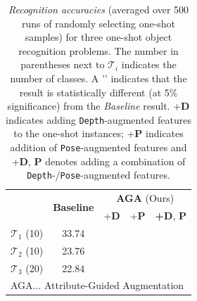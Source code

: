 \documentclass[10pt,twocolumn,letterpaper]{article}
\begin{document}
\begin{table}[t!]
\begin{tabular}{rcccc}
\hline
& \multirow{2}{*}{\textbf{Baseline}} & \multicolumn{3}{c}{\textbf{AGA} (Ours)}\\
& 						     &  +\textbf{D} & +\textbf{P} &  \textbf{+D}, \textbf{P} \\
\hline
$\mathcal{T}_1$ (10)  	& 33.74	
					&  \cellcolor{green!30}{38.84~\checkmark} 
					&  \cellcolor{green!05}{36.01~\checkmark} 
					&  \cellcolor{green!60}{39.12~\checkmark}\\
$\mathcal{T}_2$ (10) 	& 23.76  	
					&  \cellcolor{green!30}{28.95~\checkmark}
					&  \cellcolor{green!05}{27.01~\checkmark}
					&  \cellcolor{green!60}{30.13~\checkmark}\\
$\mathcal{T}_3$ (20) 	& 22.84	
					&  \cellcolor{green!30}{25.84~\checkmark}
					& \cellcolor{green!05}{24.35~\checkmark}
					&  \cellcolor{green!60}{26.91~\checkmark} \\ 
					\hline
\multicolumn{5}{l}{\footnotesize AGA$ \ldots$ Attribute-Guided Augmentation} \\
\end{tabular}
\caption{\label{table:oneshot} \emph{Recognition accuracies} (averaged over 500 runs
of randomly selecting one-shot samples) for three one-shot object recognition problems.
The number in parentheses next to $\mathcal{T}_i$ indicates the number of classes.
A '\checkmark' indicates that the result is statistically different (at 5\% significance) 
from the \emph{Baseline} result. +\textbf{D} indicates adding \texttt{Depth}-augmented 
features to the one-shot instances; +\textbf{P} indicates addition of \texttt{Pose}-augmented features
and +\textbf{D}, \textbf{P} denotes adding a combination of \texttt{Depth}-/\texttt{Pose}-augmented 
features.}
\end{table}
\end{document}
